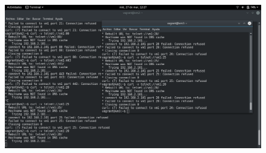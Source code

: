 \documentclass[12pt,letterpaper]{article}
\begin{document}
\begin{figure}[h]
	\centering
	\includegraphics[scale=0.34]{1al1000.png}
\end{figure}

\newpage
\end{document}
